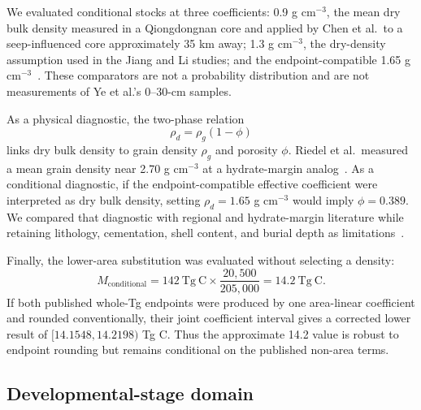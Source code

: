 \documentclass[11pt,letterpaper]{article}
\begin{document}
We evaluated conditional stocks at three coefficients: 0.9 g cm$^{-3}$, the mean dry bulk density measured in a Qiongdongnan core and applied by Chen et al.\ to a seep-influenced core approximately 35 km away; 1.3 g cm$^{-3}$, the dry-density assumption used in the Jiang and Li studies; and the endpoint-compatible 1.65 g cm$^{-3}$~\cite{chen2024,jiang2025,li2024}. These comparators are not a probability distribution and are not measurements of Ye et al.'s 0--30-cm samples.

As a physical diagnostic, the two-phase relation
\begin{equation}
\rho_d=\rho_g(1-\phi)
\label{eq:porosity}
\end{equation}
links dry bulk density to grain density $\rho_g$ and porosity $\phi$. Riedel et al.\ measured a mean grain density near 2.70 g cm$^{-3}$ at a hydrate-margin analog~\cite{riedel2006}. As a conditional diagnostic, if the endpoint-compatible effective coefficient were interpreted as dry bulk density, setting $\rho_d=1.65$ g cm$^{-3}$ would imply $\phi=0.389$. We compared that diagnostic with regional and hydrate-margin literature while retaining lithology, cementation, shell content, and burial depth as limitations~\cite{tang2025,huang2022}.

Finally, the lower-area substitution was evaluated without selecting a density:
\begin{equation}
M_{\mathrm{conditional}}
=142\ \mathrm{Tg\ C}\times
\frac{20{,}500}{205{,}000}
=14.2\ \mathrm{Tg\ C}.
\label{eq:substitution}
\end{equation}
If both published whole-Tg endpoints were produced by one area-linear coefficient and rounded conventionally, their joint coefficient interval gives a corrected lower result of $[14.1548,14.2198)$ Tg C. Thus the approximate 14.2 value is robust to endpoint rounding but remains conditional on the published non-area terms.

\subsection{Developmental-stage domain}
\end{document}
